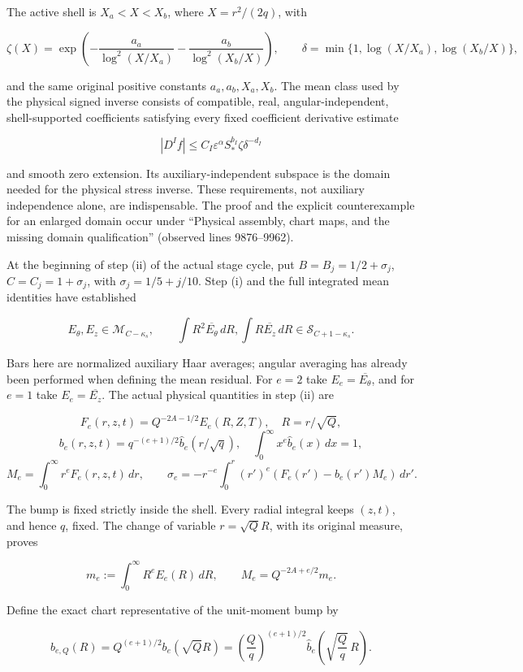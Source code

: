 \documentclass[10pt,a4paper]{article}
\begin{document}
The active shell is \(X_a<X<X_b\), where \(X=r^2/(2q)\), with

\[
\zeta(X)=\exp\!\left(-\frac{a_a}{\log^2(X/X_a)}
-\frac{a_b}{\log^2(X_b/X)}\right),\qquad
\delta=\min\{1,\log(X/X_a),\log(X_b/X)\},
\]

and the same original positive constants \(a_a,a_b,X_a,X_b\). The mean class used by the physical signed inverse consists of compatible, real, angular-independent, shell-supported coefficients satisfying every fixed coefficient derivative estimate

\[
|D^If|\le C_I\varepsilon^\alpha S_*^{b_I}\zeta\delta^{-d_I}
\]

and smooth zero extension. Its auxiliary-independent subspace is the domain needed for the physical stress inverse. These requirements, not auxiliary independence alone, are indispensable. The proof and the explicit counterexample for an enlarged domain occur under ``Physical assembly, chart maps, and the missing domain qualification'' (observed lines 9876--9962).

At the beginning of step (ii) of the actual stage cycle, put \(B=B_j=1/2+\sigma_j\), \(C=C_j=1+\sigma_j\), with \(\sigma_j=1/5+j/10\). Step (i) and the full integrated mean identities have established

\[
E_\theta,E_z\in\mathcal M_{C-\kappa_s},\qquad
\int R^2\overline{E_\theta}\,dR,
\int R\overline{E_z}\,dR\in\mathcal S_{C+1-\kappa_s}.
\]

Bars here are normalized auxiliary Haar averages; angular averaging has already been performed when defining the mean residual. For \(e=2\) take \(E_e=\overline{E_\theta}\), and for \(e=1\) take \(E_e=\overline{E_z}\). The actual physical quantities in step (ii) are

\[
F_e(r,z,t)=Q^{-2A-1/2}E_e(R,Z,T),\quad R=r/\sqrt Q,
\] \[
b_e(r,z,t)=q^{-(e+1)/2}\widehat b_e(r/\sqrt q),
\quad\int_0^\infty x^e\widehat b_e(x)\,dx=1,
\] \[
M_e=\int_0^\infty r^eF_e(r,z,t)\,dr,
\qquad
\sigma_e=-r^{-e}\int_0^r (r')^e(F_e(r')-b_e(r')M_e)\,dr'.
\]

The bump is fixed strictly inside the shell. Every radial integral keeps \((z,t)\), and hence \(q\), fixed. The change of variable \(r=\sqrt Q R\), with its original measure, proves

\[
m_e:=\int_0^\infty R^eE_e(R)\,dR,
\qquad M_e=Q^{-2A+e/2}m_e.
\tag{GC1}
\]

Define the exact chart representative of the unit-moment bump by

\[
b_{e,Q}(R)=Q^{(e+1)/2}b_e(\sqrt Q R)
=\left(\frac Qq\right)^{(e+1)/2}
\widehat b_e\!\left(\sqrt{\frac Qq}\,R\right).
\tag{GC2}
\]
\end{document}
